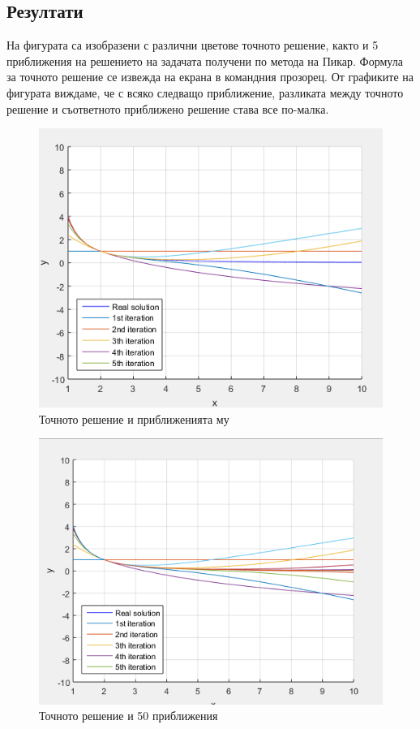 \documentclass[12pt]{article}
\begin{document}
\subsection{Резултати} На фигурата са изобразени с различни цветове точното решение, както и 5 приближения на решението на задачата получени по метода на Пикар. Формула за точното решение се извежда на екрана в командния прозорец. От графиките на фигурата виждаме, че с всяко следващо приближение, разликата между точното решение и съответното приближено решение става все по-малка. 
\begin{figure}
	\centering
	\includegraphics{5pikar.png}%
	\caption{Точното решение и приближенията му}
\end{figure} 
\begin{figure}
	\centering
	\includegraphics{50pikar.png}%
	\caption{Точното решение и 50 приближения}
\end{figure} 
\end{document}
